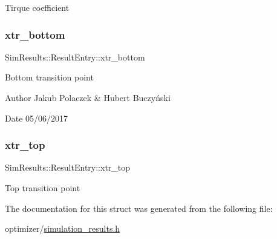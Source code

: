 Tirque coefficient \mbox{\label{struct_sim_results_1_1_result_entry_afc790d71044cb3d5f0fa9a02521c0b21}} 
\subsubsection{\texorpdfstring{xtr\+\_\+bottom}{xtr\_bottom}}
{\footnotesize\ttfamily Sim\+Results\+::\+Result\+Entry\+::xtr\+\_\+bottom}

Bottom transition point \begin{DoxyAuthor}{Author}
Jakub Polaczek \& Hubert Buczyński 
\end{DoxyAuthor}
\begin{DoxyDate}{Date}
05/06/2017 
\end{DoxyDate}
\mbox{\label{struct_sim_results_1_1_result_entry_a78de4c9c6ccbf398eb0cdc6d4a85e479}} 
\subsubsection{\texorpdfstring{xtr\+\_\+top}{xtr\_top}}
{\footnotesize\ttfamily Sim\+Results\+::\+Result\+Entry\+::xtr\+\_\+top}

Top transition point 

The documentation for this struct was generated from the following file\+:\begin{DoxyCompactItemize}
\item 
optimizer/\hyperlink{simulation__results_8h}{simulation\+\_\+results.\+h}\end{DoxyCompactItemize}

